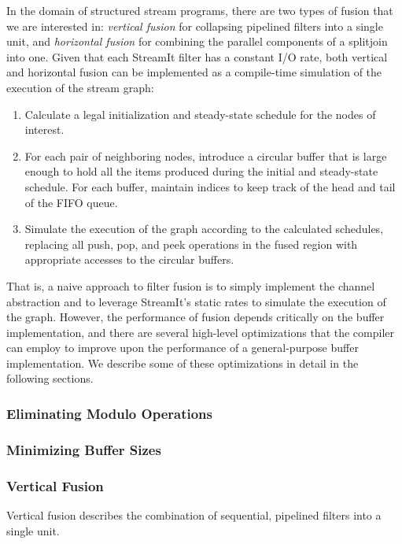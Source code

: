In the domain of structured stream programs, there are two types of
fusion that we are interested in: {\it vertical fusion} for collapsing
pipelined filters into a single unit, and {\it horizontal fusion} for
combining the parallel components of a splitjoin into one.  Given that
each StreamIt filter has a constant I/O rate, both vertical and
horizontal fusion can be implemented as a compile-time simulation of
the execution of the stream graph:
\begin{enumerate}
\item Calculate a legal initialization and steady-state schedule for
the nodes of interest.

\item For each pair of neighboring nodes, introduce a circular buffer
that is large enough to hold all the items produced during the initial
and steady-state schedule.  For each buffer, maintain indices to keep
track of the head and tail of the FIFO queue.

\item Simulate the execution of the graph according to the calculated
schedules, replacing all push, pop, and peek operations in the fused
region with appropriate accesses to the circular buffers.
\end{enumerate}
That is, a naive approach to filter fusion is to simply implement the
channel abstraction and to leverage StreamIt's static rates to
simulate the execution of the graph.  However, the performance of
fusion depends critically on the buffer implementation, and there are
several high-level optimizations that the compiler can employ to
improve upon the performance of a general-purpose buffer
implementation.  We describe some of these optimizations in detail in
the following sections.

\subsubsection{Eliminating Modulo Operations}

\subsubsection{Minimizing Buffer Sizes}

\subsubsection{Vertical Fusion}

Vertical fusion describes the combination of sequential, pipelined
filters into a single unit.

